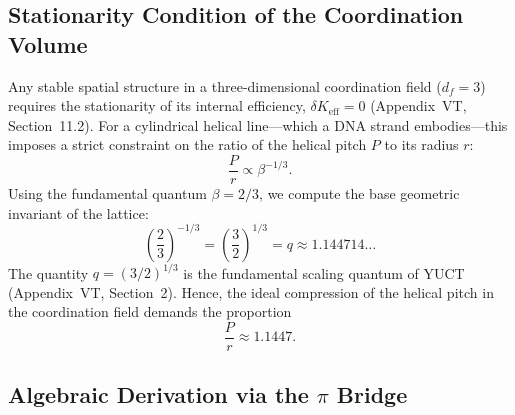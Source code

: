 \documentclass[12pt,a4paper]{article}
\newcommand{\Keff}{K_{\mathrm{eff}}}
\newcommand{\df}{d_{\!f}}
\begin{document}
	\subsection{Stationarity Condition of the Coordination Volume}
	
	Any stable spatial structure in a three‑dimensional coordination field (\(\df = 3\)) requires the stationarity of its internal efficiency, \(\delta\Keff = 0\) (Appendix~VT, Section~11.2). For a cylindrical helical line—which a DNA strand embodies—this imposes a strict constraint on the ratio of the helical pitch \(P\) to its radius \(r\):
	\begin{equation}
		\frac{P}{r} \propto \beta^{-1/3}.
		\label{eq:dna-pr}
	\end{equation}
	Using the fundamental quantum \(\beta = 2/3\), we compute the base geometric invariant of the lattice:
	\begin{equation}
		\left(\frac{2}{3}\right)^{-1/3} = \left(\frac{3}{2}\right)^{1/3} = q \approx 1.144714\ldots
		\label{eq:q-def}
	\end{equation}
	The quantity \(q = (3/2)^{1/3}\) is the fundamental scaling quantum of YUCT (Appendix~VT, Section~2). Hence, the ideal compression of the helical pitch in the coordination field demands the proportion
	\begin{equation}
		\frac{P}{r} \approx 1.1447.
		\label{eq:pr-ideal}
	\end{equation}
	
	\subsection{Algebraic Derivation via the \(\pi\) Bridge}
	
\end{document}
